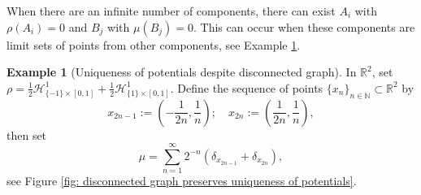 \documentclass[11pt, oneside, titlepage]{book}
\theoremstyle{plain}
\theoremstyle{definition}
\newtheorem{example}[theorem]{Example}
\newcommand{\R}{\mathbb{R}}
\newcommand{\N}{\mathbb{N}}
\begin{document}
When there are an infinite number of components, there can exist $A_i$ with $\rho(A_i)= 0$ and $B_j$ with $\mu(B_j) = 0$. This can occur when these components are limit sets of points from other components, see Example \ref{ex: uniqueness despite disconnected graph}.
\begin{example}[Uniqueness of potentials despite disconnected graph]
\label{ex: uniqueness despite disconnected graph}
    In $\R^2$, set $\rho = \frac{1}{2}\mathcal{H}^1_{\{-1\} \times [0, 1]} + \frac{1}{2}\mathcal{H}^1_{\{1\} \times [0, 1]}$. Define the sequence of points $\{x_n\}_{n \in \N} \subset \R^2$ by
    \begin{equation*}
        x_{2n -1} := \left(-\frac{1}{2n}, \frac{1}{n}\right); \quad  x_{2n} := \left(\frac{1}{2n}, \frac{1}{n}\right),
    \end{equation*}
    then set
    \begin{equation*}
        \mu = \sum_{n = 1}^\infty 2^{-n}(\delta_{x_{2n-1}} + \delta_{ x_{2n}}),
    \end{equation*}
see Figure \ref{fig: disconnected graph preserves uniqueness of potentials}.
\begin{figure}[h]
    \centering
    
    \begin{minipage}{0.48\linewidth}
      \centering
\end{minipage}
\end{figure}
\end{example}
\end{document}
